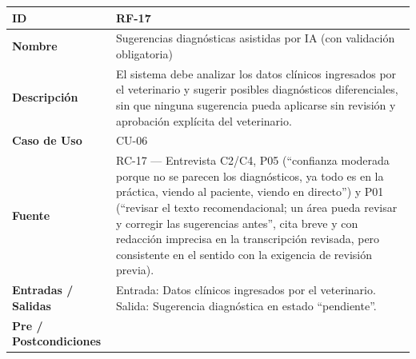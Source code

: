\documentclass[
]{article}
\newcounter{none} %
\begin{document}
{\def\LTcaptype{none} %
\begin{longtable}[]{|
  >{\raggedright\arraybackslash}p{}|
  >{\raggedright\arraybackslash}p{}|}
\hline
\begin{minipage}[b]{\linewidth}\raggedright
\textbf{ID}
\end{minipage} & \begin{minipage}[b]{\linewidth}\raggedright
RF-17
\end{minipage} \\
\hline
\endhead
\hline
\endlastfoot
\textbf{Nombre} & \begin{minipage}[t]{\linewidth}\raggedright
Sugerencias diagnósticas asistidas por IA (con validación obligatoria)
\end{minipage} \\
\hline
\textbf{Descripción} & \begin{minipage}[t]{\linewidth}\raggedright
El sistema debe analizar los datos clínicos ingresados por el veterinario y sugerir posibles diagnósticos diferenciales, sin que ninguna sugerencia pueda aplicarse sin revisión y aprobación explícita del veterinario.
\end{minipage} \\
\hline
\textbf{Caso de Uso} & \begin{minipage}[t]{\linewidth}\raggedright
CU-06
\end{minipage} \\
\hline
\textbf{Fuente} & \begin{minipage}[t]{\linewidth}\raggedright
RC-17 — Entrevista C2/C4, P05 (“confianza moderada porque no se parecen los diagnósticos, ya todo es en la práctica, viendo al paciente, viendo en directo”) y P01 (“revisar el texto recomendacional; un área pueda revisar y corregir las sugerencias antes”, cita breve y con redacción imprecisa en la transcripción revisada, pero consistente en el sentido con la exigencia de revisión previa).
\end{minipage} \\
\hline
\textbf{Entradas / Salidas} & \begin{minipage}[t]{\linewidth}\raggedright
Entrada: Datos clínicos ingresados por el veterinario. Salida: Sugerencia diagnóstica en estado “pendiente”.
\end{minipage} \\
\hline
\textbf{Pre / Postcondiciones} & \begin{minipage}[t]{\linewidth}\raggedright

\end{minipage}
\end{longtable}}
\end{document}

